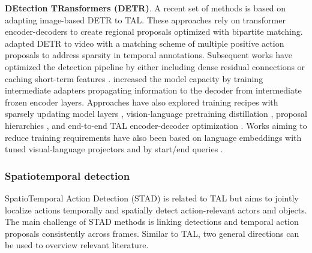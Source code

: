 \noindent
\textbf{DEtection TRansformers (DETR)}. A recent set of methods is based on adapting image-based DETR \citep{carion2020end} to TAL. These approaches rely on transformer encoder-decoders to create regional proposals optimized with bipartite matching. \citet{tan2021relaxed} adapted DETR to video with a matching scheme of multiple positive action proposals to address sparsity in temporal annotations. Subsequent works have optimized the detection pipeline by either including dense residual connections \citep{zhao2023re2tal} or caching short-term features \citep{cheng2022tallformer,hong2022spotting}. 
\citet{liu2024end} increased the model capacity by training intermediate adapters propagating information to the decoder from intermediate frozen encoder layers. Approaches have also explored training recipes with sparsely updating model layers \citep{cheng2022stochastic}, vision-language pretraining distillation \citep{ju2023distilling}, proposal hierarchies \citep{wu2023newsnet},
and end-to-end TAL encoder-decoder optimization \citep{liu2022empirical}. Works aiming to reduce training requirements have also been based on language embeddings with tuned visual-language projectors \citep{liberatori2024test} and by start/end queries \citep{aklilu2024zero}.



\subsubsection{Spatiotemporal detection} 

SpatioTemporal Action Detection (STAD) is related to TAL but aims to jointly localize actions temporally and spatially detect action-relevant actors and objects. The main challenge of STAD methods is linking detections and temporal action proposals consistently across frames. Similar to TAL, two general directions can be used to overview relevant literature. 



